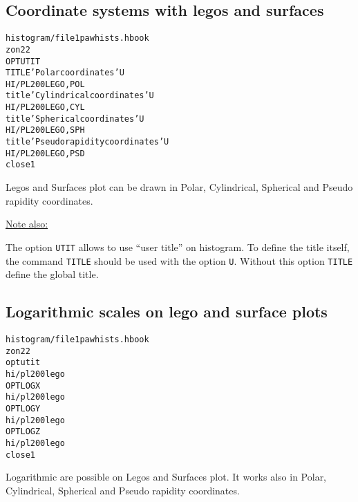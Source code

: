 \subsection*{Coordinate systems with legos and surfaces}
\begin{alltt}
      histogram/file 1 pawhists.hbook
      zon 2 2
     OPT UTIT
     TITLE 'Polar coordinates' U
     HI/PL 200 LEGO,POL
      title 'Cylindrical coordinates' U
     HI/PL 200 LEGO,CYL
      title 'Spherical coordinates' U
     HI/PL 200 LEGO,SPH
      title 'Pseudo rapidity coordinates' U
     HI/PL 200 LEGO,PSD
      close 1
\end{alltt}
\begin{DinglistE}
\item Legos and Surfaces plot can be drawn in Polar, Cylindrical,
      Spherical and Pseudo rapidity coordinates. 

\underline{Note also:}

\item The option {\tt UTIT} allows to use ``user title'' on histogram. To
      define the title itself, the command {\tt TITLE} should be
      used with the option {\tt U}. Without this option {\tt TITLE}
      define the global title.
\end{DinglistE}

\clearpage

\subsection{Logarithmic scales on lego and surface plots}

\begin{alltt}
      histogram/file 1 pawhists.hbook
      zon 2 2
      opt utit
      hi/pl 200 lego
     OPT LOGX
      hi/pl 200 lego
     OPT LOGY
      hi/pl 200 lego
     OPT LOGZ
      hi/pl 200 lego
      close 1
\end{alltt}
\begin{DinglistE}
\item Logarithmic are possible on Legos and Surfaces plot. It works also
      in Polar, Cylindrical, Spherical and Pseudo rapidity coordinates. 
\end{DinglistE}


